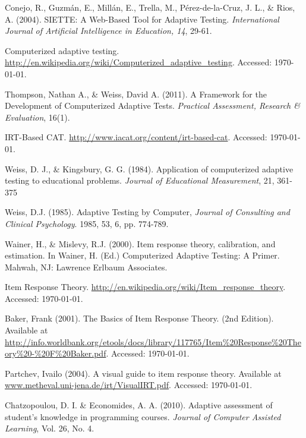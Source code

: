 \begin{thebibliography}{9}

 Conejo, R., Guzmán, E., Millán, E., Trella, M., Pérez-de-la-Cruz, J. L., \& Rios, A. (2004). SIETTE: A Web-Based Tool for Adaptive Testing. \textit{International Journal of Artificial Intelligence in Education, 14}, 29-61.

 Computerized adaptive testing. \url{http://en.wikipedia.org/wiki/Computerized_adaptive_testing}. Accessed: \today.

 Thompson, Nathan A., \& Weiss, David A. (2011). A Framework for the Development of Computerized Adaptive Tests. \textit{Practical Assessment, Research \& Evaluation}, 16(1).

 IRT-Based CAT. \url{http://www.iacat.org/content/irt-based-cat}. Accessed: \today.

 Weiss, D. J., \& Kingsbury, G. G. (1984). Application of computerized adaptive testing to educational problems. \textit{Journal of Educational Measurement}, 21, 361-375

 Weiss, D.J. (1985). Adaptive Testing by Computer, \textit{Journal of Consulting and Clinical Psychology}. 1985, 53, 6, pp. 774-789.

 Wainer, H., \& Mislevy, R.J. (2000). Item response theory, calibration, and estimation. In Wainer, H. (Ed.) Computerized Adaptive Testing: A Primer. Mahwah, NJ: Lawrence Erlbaum Associates.

 Item Response Theory. \url{http://en.wikipedia.org/wiki/Item_response_theory}. Accessed: \today.

 Baker, Frank (2001). The Basics of Item Response Theory. (2nd Edition). Available at \url{http://info.worldbank.org/etools/docs/library/117765/Item\%20Response\%20Theory\%20-\%20F\%20Baker.pdf}. Accessed: \today.

 Partchev, Ivailo (2004). A visual guide to item response theory. Available at \url{www.metheval.uni-jena.de/irt/VisualIRT.pdf}. Accessed: \today.

 Chatzopoulou, D. I. \& Economides, A. A. (2010). Adaptive assessment of student's knowledge in programming courses. \textit{Journal of Computer Assisted Learning}, Vol. 26, No. 4.


\end{thebibliography}